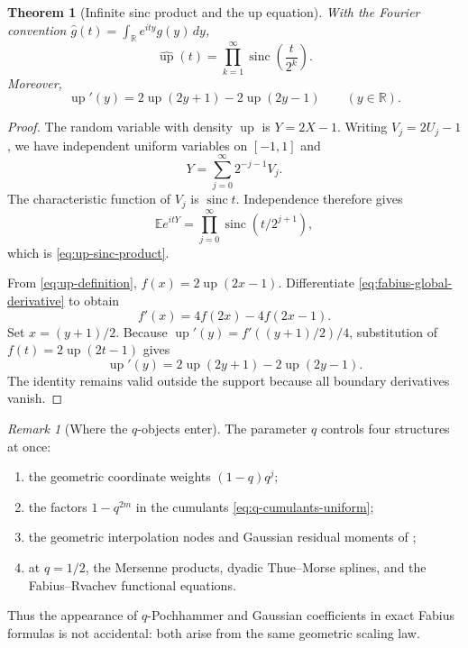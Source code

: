 \documentclass[11pt,oneside,openany]{book}
\newtheorem{theorem}{Theorem}[chapter]
\theoremstyle{definition}
\theoremstyle{remark}
\newtheorem{remark}[remark]{Remark}
\newcommand{\R}{\mathbb R}
\begin{document}
\begin{theorem}[Infinite sinc product and the up equation]\label{thm:up-sinc-product}
With the Fourier convention
$\widehat g(t)=\int_{\R}e^{ity}g(y)\,dy$,
\begin{equation}\label{eq:up-sinc-product}
 \widehat{\operatorname{up}}(t)
 =\prod_{k=1}^{\infty}\operatorname{sinc}\!\left(\frac{t}{2^k}\right).
\end{equation}
Moreover,
\begin{equation}\label{eq:up-functional-differential}
 \operatorname{up}'(y)
 =2\operatorname{up}(2y+1)-2\operatorname{up}(2y-1)
 \qquad(y\in\R).
\end{equation}
\end{theorem}

\begin{proof}
The random variable with density $\operatorname{up}$ is
$Y=2X-1$.  Writing $V_j=2U_j-1$, we have independent uniform variables on $[-1,1]$ and
\[
 Y=\sum_{j=0}^{\infty}2^{-j-1}V_j.
\]
The characteristic function of $V_j$ is $\operatorname{sinc}t$.  Independence therefore gives
\[
 \mathbb Ee^{itY}
 =\prod_{j=0}^{\infty}\operatorname{sinc}(t/2^{j+1}),
\]
which is \eqref{eq:up-sinc-product}.

From \eqref{eq:up-definition},
$f(x)=2\operatorname{up}(2x-1)$.  Differentiate
\eqref{eq:fabius-global-derivative} to obtain
\[
 f'(x)=4f(2x)-4f(2x-1).
\]
Set $x=(y+1)/2$.  Because
$\operatorname{up}'(y)=f'((y+1)/2)/4$, substitution of
$f(t)=2\operatorname{up}(2t-1)$ gives
\[
 \operatorname{up}'(y)
 =2\operatorname{up}(2y+1)-2\operatorname{up}(2y-1).
\]
The identity remains valid outside the support because all boundary derivatives vanish.
\end{proof}

\begin{remark}[Where the $q$-objects enter]
The parameter $q$ controls four structures at once:
\begin{enumerate}
\item the geometric coordinate weights $(1-q)q^j$;
\item the factors $1-q^{2m}$ in the cumulants \eqref{eq:q-cumulants-uniform};
\item the geometric interpolation nodes and Gaussian residual moments of ;
\item at $q=1/2$, the Mersenne products, dyadic Thue--Morse splines, and the Fabius--Rvachev functional equations.
\end{enumerate}
Thus the appearance of $q$-Pochhammer and Gaussian coefficients in exact Fabius formulas is not accidental: both arise from the same geometric scaling law.
\end{remark}
\end{document}
